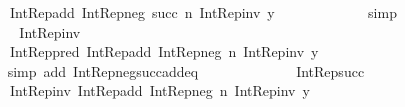 \begin{isabellebody}
\ \ \ \ \ \ \ \ \ \ \ \ Int{\isacharunderscore}{\kern0pt}Rep{\isacharunderscore}{\kern0pt}add\ {\isacharparenleft}{\kern0pt}Int{\isacharunderscore}{\kern0pt}Rep{\isacharunderscore}{\kern0pt}neg\ {\isacharparenleft}{\kern0pt}succ\ n{\isacharparenright}{\kern0pt}{\isacharparenright}{\kern0pt}\ {\isacharparenleft}{\kern0pt}Int{\isacharunderscore}{\kern0pt}Rep{\isacharunderscore}{\kern0pt}inv\ y{\isacharparenright}{\kern0pt}\isanewline
\ \ \ \ \ \ \ \ \ \ {\isacharparenright}{\kern0pt}{\isachardoublequoteclose}\ \isamarkupfalse%
\ simp\isanewline
\ \ \ \ \ \ \ \ \isamarkupfalse%
\ \isamarkupfalse%
\ {\isachardoublequoteopen}{\isachardot}{\kern0pt}{\isachardot}{\kern0pt}{\isachardot}{\kern0pt}\ {\isacharequal}{\kern0pt}\ Int{\isacharunderscore}{\kern0pt}Rep{\isacharunderscore}{\kern0pt}inv\ {\isacharparenleft}{\kern0pt}\isanewline
\ \ \ \ \ \ \ \ \ \ \ \ Int{\isacharunderscore}{\kern0pt}Rep{\isacharunderscore}{\kern0pt}pred\ {\isacharparenleft}{\kern0pt}Int{\isacharunderscore}{\kern0pt}Rep{\isacharunderscore}{\kern0pt}add\ {\isacharparenleft}{\kern0pt}Int{\isacharunderscore}{\kern0pt}Rep{\isacharunderscore}{\kern0pt}neg\ n{\isacharparenright}{\kern0pt}\ {\isacharparenleft}{\kern0pt}Int{\isacharunderscore}{\kern0pt}Rep{\isacharunderscore}{\kern0pt}inv\ y{\isacharparenright}{\kern0pt}{\isacharparenright}{\kern0pt}\isanewline
\ \ \ \ \ \ \ \ \ \ {\isacharparenright}{\kern0pt}{\isachardoublequoteclose}\isanewline
\ \ \ \ \ \ \ \ \ \ \isamarkupfalse%
\ {\isacharparenleft}{\kern0pt}simp\ add{\isacharcolon}{\kern0pt}\ Int{\isacharunderscore}{\kern0pt}Rep{\isacharunderscore}{\kern0pt}neg{\isacharunderscore}{\kern0pt}succ{\isacharunderscore}{\kern0pt}add{\isacharunderscore}{\kern0pt}eq{\isacharparenright}{\kern0pt}\isanewline
\ \ \ \ \ \ \ \ \isamarkupfalse%
\ \isamarkupfalse%
\ {\isachardoublequoteopen}{\isachardot}{\kern0pt}{\isachardot}{\kern0pt}{\isachardot}{\kern0pt}\ {\isacharequal}{\kern0pt}\ Int{\isacharunderscore}{\kern0pt}Rep{\isacharunderscore}{\kern0pt}succ\ {\isacharparenleft}{\kern0pt}\isanewline
\ \ \ \ \ \ \ \ \ \ \ \ Int{\isacharunderscore}{\kern0pt}Rep{\isacharunderscore}{\kern0pt}inv\ {\isacharparenleft}{\kern0pt}Int{\isacharunderscore}{\kern0pt}Rep{\isacharunderscore}{\kern0pt}add\ {\isacharparenleft}{\kern0pt}Int{\isacharunderscore}{\kern0pt}Rep{\isacharunderscore}{\kern0pt}neg\ n{\isacharparenright}{\kern0pt}\ {\isacharparenleft}{\kern0pt}Int{\isacharunderscore}{\kern0pt}Rep{\isacharunderscore}{\kern0pt}inv\ y{\isacharparenright}{\kern0pt}{\isacharparenright}{\kern0pt}\isanewline

\end{isabellebody}
